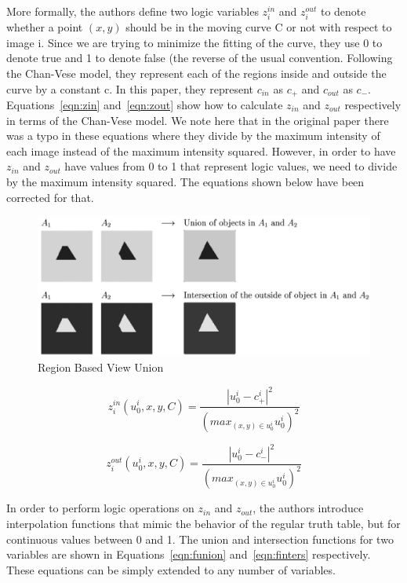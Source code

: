 \documentclass[10pt,twocolumn,letterpaper]{article}
\begin{document}
More formally, the authors define two logic variables $z_{i}^{in}$ and $z_{i}^{out}$ to denote whether a point $(x,y)$ should be in the moving curve C or not
with respect to image i. Since we are trying to minimize the fitting of the curve, they use 0 to denote true and 1 to denote false (the reverse of the usual
convention. Following the Chan-Vese model, they represent each of the regions inside and outside the curve by a constant c. In this paper, they represent
$c_{in}$ as $c_{+}$ and $c_{out}$ as $c_{-}$. Equations~\ref{eqn:zin} and~\ref{eqn:zout} show how to calculate $z_{in}$ and $z_{out}$ respectively in terms of
the Chan-Vese model. We note here that in the original paper there was a typo in these equations where they divide by the maximum intensity of each image
instead of the maximum intensity squared. However, in order to have $z_{in}$ and $z_{out}$ have values from 0 to 1 that represent logic values, we need to
divide by the maximum intensity squared. The equations shown below have been corrected for that.

\begin{figure}[t]
\centering
\includegraphics[width=12cm]{logicop.png}
\caption{Region Based View Union}
\label{fig:logic-op}
\end{figure}

\begin{equation}
\label{eqn:zin}
z_{i}^{in}(u_{0}^{i},x,y,C) = \frac{|u_{0}^{i} - c_{+}^i|^2}{(max_{(x,y) \in u_{0}^{i}} u_{0}^i)^2}
\end{equation}

\begin{equation}
\label{eqn:zout}
z_{i}^{out}(u_{0}^{i},x,y,C) = \frac{|u_{0}^{i} - c_{-}^i|^2}{(max_{(x,y) \in u_{0}^{i}} u_{0}^i)^2}
\end{equation}

In order to perform logic operations on $z_{in}$ and $z_{out}$, the authors introduce interpolation functions that mimic the behavior of the regular truth
table, but for continuous values between 0 and 1. The union and intersection functions for two variables are shown in Equations~\ref{eqn:funion}
and~\ref{eqn:finters} respectively. These equations can be simply extended to any number of variables.
\end{document}
